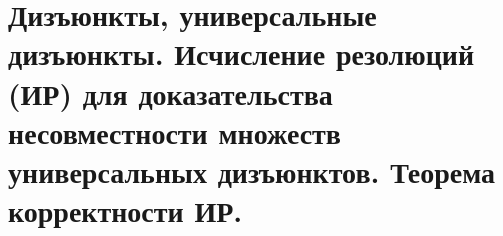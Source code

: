 \section{Дизъюнкты, универсальные дизъюнкты. Исчисление резолюций (ИР) для доказательства несовместности множеств универсальных дизъюнктов. Теорема корректности ИР.}